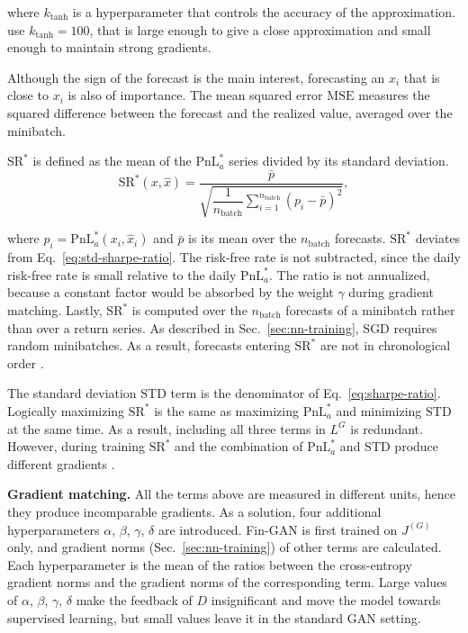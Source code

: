 where $k_{\tanh}$ is a hyperparameter that controls the accuracy of the approximation. \textcite{vuleticFinGANForecastingClassifying2024} use $k_{\tanh}=100$, that is large enough to give a close approximation and small enough to maintain strong gradients. 

Although the sign of the forecast is the main interest, forecasting an $\hat{x}_i$ that is close to $x_i$ is also of importance. The mean squared error $\mathrm{MSE}$ measures the squared difference between the forecast and the realized value, averaged over the minibatch.

$\mathrm{SR}^{*}$ is defined as the mean of the $\mathrm{PnL}^{*}_{a}$ series divided by its standard deviation.
\begin{equation}
\mathrm{SR}^{*}(x, \hat{x}) = \frac{\bar{p}}{\sqrt{\dfrac{1}{n_{\text{batch}}} \sum_{i=1}^{n_{\text{batch}}} \left( p_i - \bar{p} \right)^{2}}},
\label{eq:sharpe-ratio}
\end{equation}

where $p_i = \mathrm{PnL}^{*}_{a}(x_i, \hat{x}_i)$ and $\bar{p}$ is its mean over the $n_{\mathrm{batch}}$ forecasts. $\mathrm{SR}^{*}$ deviates from Eq.~\ref{eq:std-sharpe-ratio}. The risk-free rate is not subtracted, since the daily risk-free rate is small relative to the daily $\mathrm{PnL}^*_a$. The ratio is not annualized, because a constant factor would be absorbed by the weight $\gamma$ during gradient matching. Lastly, $\mathrm{SR}^*$ is computed over the $n_{\mathrm{batch}}$ forecasts of a minibatch rather than over a return series. As described in Sec.~\ref{sec:nn-training}, SGD requires random minibatches. As a result, forecasts entering $\mathrm{SR}^*$ are not in chronological order \parencite[11]{vuleticFinGANForecastingClassifying2024}.

The standard deviation $\mathrm{STD}$ term is the denominator of Eq.~\ref{eq:sharpe-ratio}. Logically maximizing $\mathrm{SR}^{*}$ is the same as maximizing $\mathrm{PnL}^{*}_{a}$ and minimizing $\mathrm{STD}$ at the same time. As a result, including all three terms in $L^{G}$ is redundant. However, during training $\mathrm{SR}^{*}$ and the combination of $\mathrm{PnL}^{*}_{a}$ and $\mathrm{STD}$ produce different gradients \parencite{vuleticFinGANForecastingClassifying2024}.

\textbf{Gradient matching.} All the terms above are measured in different units, hence they produce incomparable gradients. As a solution, four additional hyperparameters $\alpha$, $\beta$, $\gamma$, $\delta$ are introduced. Fin-GAN is first trained on $J^{(G)}$ only, and gradient norms (Sec.~\ref{sec:nn-training}) of other terms are calculated. Each hyperparameter is the mean of the ratios between the cross-entropy gradient norms and the gradient norms of the corresponding term.
Large values of $\alpha$, $\beta$, $\gamma$, $\delta$ make the feedback of $D$ insignificant and move the model towards supervised learning, but small values leave it in the standard GAN setting.

